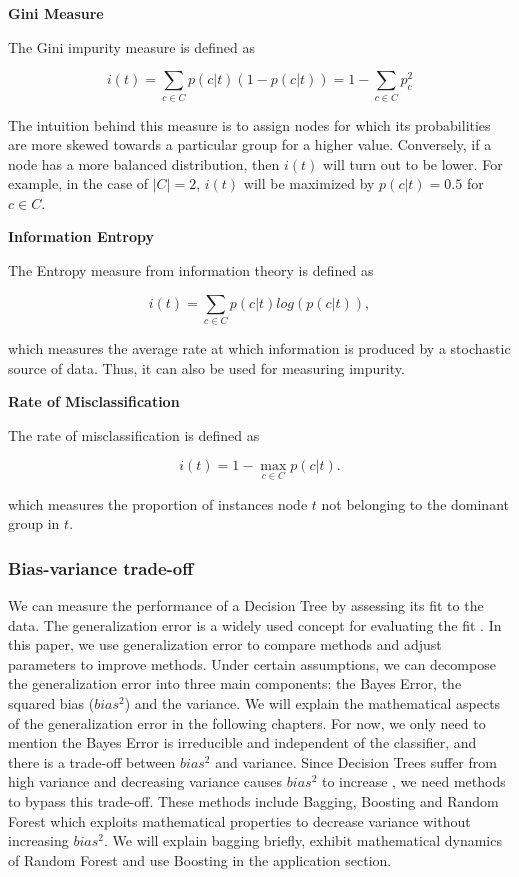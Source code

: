 \textbf{Gini Measure}

The Gini impurity measure is defined as 


\begin{equation}
    i(t) = \sum_{c \in C} p(c|t) (1 - p(c|t)) = 1 - \sum_{c \in C} p_{c}^{2}
\end{equation}

The intuition behind this measure is to assign nodes 
for which its probabilities are more skewed towards a particular group for a higher value.
Conversely, if a node has a more balanced distribution, then \(i(t)\) will turn out to be lower.
For example, in the case of \( |C|=2 \), \(i(t)\) will be maximized by \( p(c|t) = 0.5 \) for \( c \in C \).


\textbf{Information Entropy}

The Entropy measure from information theory is defined as

\begin{equation}
    i(t) = \sum_{c \in C} p(c|t) log(p(c|t)),
\end{equation}

which measures the average rate at which information is produced by a stochastic source of data.
Thus, it can also be used for measuring impurity.


\textbf{Rate of Misclassification}

The rate of misclassification is defined as 

\begin{equation}
    i(t) = 1 - \max_{c \in C} p(c|t) .
\end{equation}

which measures the proportion of instances node \(t\) not belonging to the dominant group in \(t\).


\subsubsection{Bias-variance trade-off}
We can measure the performance of a Decision Tree by assessing its fit to the data. 
The generalization error is a widely used concept for evaluating the fit \cite{breiman2001random}.
In this paper, we use generalization error to compare methods and adjust parameters to improve methods. 
Under certain assumptions, we can decompose the generalization error into three main components:
the Bayes Error, the squared bias ($bias^2$) and the variance. 
We will explain the mathematical aspects of the generalization error in the following chapters. 
For now, we only need to mention the Bayes Error is irreducible and independent of the classifier, 
and there is a trade-off between $bias^2$ and variance. Since Decision Trees suffer from high variance and 
decreasing variance causes $bias^2$ to increase \cite{geman1992neural}, we need methods to bypass this trade-off. 
These methods include Bagging, Boosting and Random Forest 
which exploits mathematical properties to decrease variance without increasing $bias^2$. 
We will explain bagging briefly, exhibit mathematical dynamics of Random Forest and 
use Boosting in the application section.


